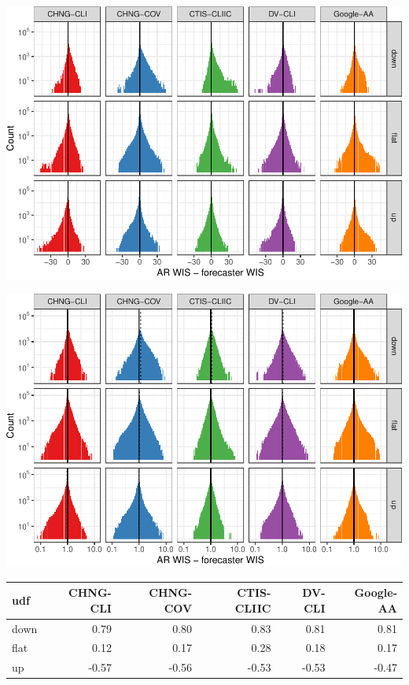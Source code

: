 \documentclass[9pt,twoside,lineno]{pnas-new}
\begin{document}
\begin{center}\includegraphics[width=\linewidth]{fig/upswing-histogram-1} \end{center}

\begin{center}\includegraphics[width=\linewidth]{fig/upswing-histogram-logged-1} \end{center}

\begin{tabular}[t]{lrrrrr}
\toprule
udf & CHNG-CLI & CHNG-COV & CTIS-CLIIC & DV-CLI & Google-AA\\
\midrule
down & 0.79 & 0.80 & 0.83 & 0.81 & 0.81\\
flat & 0.12 & 0.17 & 0.28 & 0.18 & 0.17\\
up & -0.57 & -0.56 & -0.53 & -0.53 & -0.47\\
\bottomrule
\end{tabular}
\end{document}
